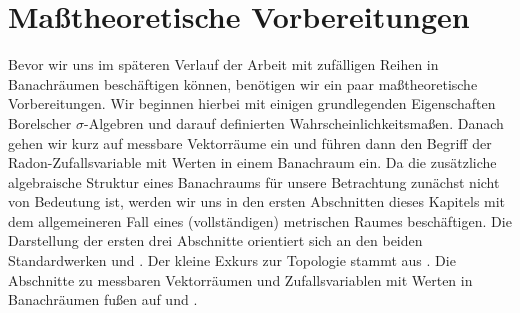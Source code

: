 \chapter{Ma\ss theoretische Vorbereitungen}
Bevor wir uns im späteren Verlauf der Arbeit mit zufälligen Reihen in Banachräumen beschäftigen können, benötigen wir ein paar maßtheoretische Vorbereitungen. 
Wir beginnen hierbei mit einigen grundlegenden Eigenschaften Borelscher $\sigma$-Algebren und darauf definierten Wahrscheinlichkeitsmaßen. 
Danach gehen wir kurz auf messbare Vektorräume ein und führen dann den Begriff der Radon-Zufallsvariable mit Werten in einem Banachraum ein. 
Da die zusätzliche algebraische Struktur eines Banachraums für unsere Betrachtung zunächst nicht von Bedeutung ist, 
werden wir uns in den ersten Abschnitten dieses Kapitels mit dem allgemeineren Fall eines (vollständigen) metrischen Raumes beschäftigen. 
Die Darstellung der ersten drei Abschnitte orientiert sich an den beiden Standardwerken \cite{parthasarathy} und \cite{billingsley}. Der kleine Exkurs zur Topologie stammt aus \cite{preuss}. 
Die Abschnitte zu messbaren Vektorräumen und Zufallsvariablen mit Werten in Banachräumen fußen auf \cite{vakhania} und \cite{ledoux-talagrand}. 



\newpage







